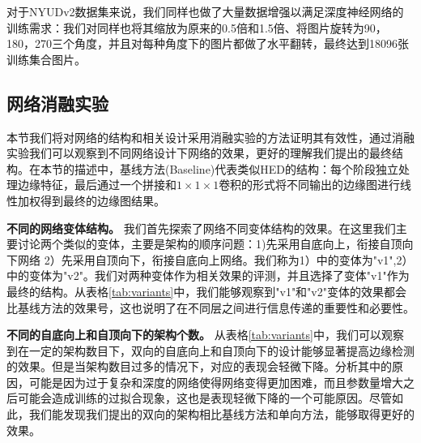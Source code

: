 \documentclass[master]{thesis-uestc}
\begin{document}
{对于NYUDv2数据集来说，我们同样也做了大量数据增强以满足深度神经网络的训练需求：我们对同样也将其缩放为原来的0.5倍和1.5倍、将图片旋转为90，180，270三个角度，并且对每种角度下的图片都做了水平翻转，最终达到18096张训练集合图片。

\subsection{网络消融实验}
本节我们将对网络的结构和相关设计采用消融实验的方法证明其有效性，通过消融实验我们可以观察到不同网络设计下网络的效果，更好的理解我们提出的最终结构。在本节的描述中，基线方法(Baseline)代表类似HED的结构：每个阶段独立处理边缘特征，最后通过一个拼接和$1 \times 1 \times 1$卷积的形式将不同输出的边缘图进行线性加权得到最终的边缘图结果。

\textbf{不同的网络变体结构。} 我们首先探索了网络不同变体结构的效果。在这里我们主要讨论两个类似的变体，主要是架构的顺序问题：1)先采用自底向上，衔接自顶向下网络 2）先采用自顶向下，衔接自底向上网络。我们称为1）中的变体为"v1",2）中的变体为"v2"。我们对两种变体作为相关效果的评测，并且选择了变体"v1"作为最终的结构。从表格\ref{tab:variants}中，我们能够观察到"v1"和"v2"变体的效果都会比基线方法的效果号，这也说明了在不同层之间进行信息传递的重要性和必要性。
\begin{table}[h!]
    \caption{不同变体架构之间的效果对比}
    \centering
    \label{tab:variants}
\end{table}

\textbf{不同的自底向上和自顶向下的架构个数。} 从表格\ref{tab:variants}中，我们可以观察到在一定的架构数目下，双向的自底向上和自顶向下的设计能够显著提高边缘检测的效果。但是当架构数目过多的情况下，对应的表现会轻微下降。分析其中的原因，可能是因为过于复杂和深度的网络使得网络变得更加困难，而且参数量增大之后可能会造成训练的过拟合现象，这也是表现轻微下降的一个可能原因。尽管如此，我们能发现我们提出的双向的架构相比基线方法和单向方法，能够取得更好的效果。

}
\end{document}
